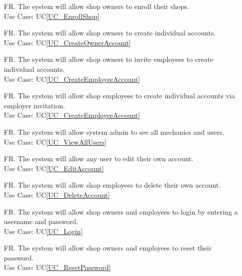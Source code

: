\documentclass[12pt]{article}
\newcounter{reqnum} %
\begin{document}
\noindent \begin{itemize}

\item[FR\refstepcounter{reqnum}\thereqnum \label{R_EnrollShop}.] The system will allow shop owners to enroll their shops.\\
Use Case: UC\ref{UC_EnrollShop}

\item[FR\refstepcounter{reqnum}\thereqnum \label{R_CreateOwnerAccount}.] The system will allow shop owners to create individual accounts.\\
Use Case: UC\ref{UC_CreateOwnerAccount}

\item[FR\refstepcounter{reqnum}\thereqnum \label{R_InviteEmployee}.] The system will allow shop owners to invite employees to create individual accounts.\\
Use Case: UC\ref{UC_CreateEmployeeAccount}

\item[FR\refstepcounter{reqnum}\thereqnum \label{R_CreateEmployeeAccount}.] The system will allow shop employees to create individual accounts via employer invitation.\\
Use Case: UC\ref{UC_CreateEmployeeAccount}

\item[FR\refstepcounter{reqnum}\thereqnum \label{R_SeeAllUsers}.] The system will allow system admin to see all mechanics and users.\\
Use Case: UC\ref{UC_ViewAllUsers}

\item[FR\refstepcounter{reqnum}\thereqnum \label{R_EditAccount}.] The system will allow any user to edit their own account.\\
Use Case: UC\ref{UC_EditAccount}

\item[FR\refstepcounter{reqnum}\thereqnum \label{R_DeleteAccount}.] The system will allow shop employees to delete their own account.\\
Use Case: UC\ref{UC_DeleteAccount}

\item[FR\refstepcounter{reqnum}\thereqnum \label{R_Login}.] The system will allow shop owners and employees to login by entering a username and password.\\
Use Case: UC\ref{UC_Login}

\item[FR\refstepcounter{reqnum}\thereqnum \label{R_RestPassword}.] The system will allow shop owners and employees to reset their password.\\
Use Case: UC\ref{UC_ResetPassword}


\end{itemize}
\end{document}
